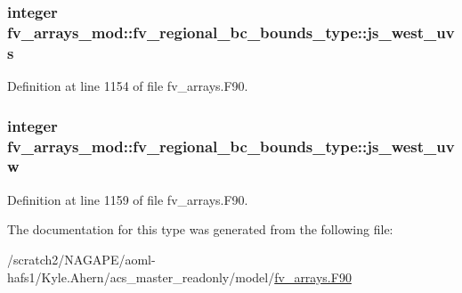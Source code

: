 \subsubsection[{js\-\_\-west\-\_\-uvs}]{\setlength{\rightskip}{0pt plus 5cm}integer fv\-\_\-arrays\-\_\-mod\-::fv\-\_\-regional\-\_\-bc\-\_\-bounds\-\_\-type\-::js\-\_\-west\-\_\-uvs}\label{structfv__arrays__mod_1_1fv__regional__bc__bounds__type_afa59505db0ef56a01c9ece80b6009385}


Definition at line 1154 of file fv\-\_\-arrays.\-F90.

\subsubsection[{js\-\_\-west\-\_\-uvw}]{\setlength{\rightskip}{0pt plus 5cm}integer fv\-\_\-arrays\-\_\-mod\-::fv\-\_\-regional\-\_\-bc\-\_\-bounds\-\_\-type\-::js\-\_\-west\-\_\-uvw}\label{structfv__arrays__mod_1_1fv__regional__bc__bounds__type_a05f07532dd5f7a68570bf69658d4fee8}


Definition at line 1159 of file fv\-\_\-arrays.\-F90.



The documentation for this type was generated from the following file\-:\begin{DoxyCompactItemize}
\item 
/scratch2/\-N\-A\-G\-A\-P\-E/aoml-\/hafs1/\-Kyle.\-Ahern/acs\-\_\-master\-\_\-readonly/model/\hyperlink{fv__arrays_8F90}{fv\-\_\-arrays.\-F90}\end{DoxyCompactItemize}
